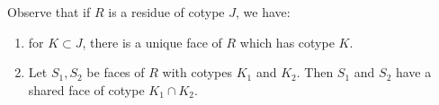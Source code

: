 \documentclass[11pt]{article}
\begin{document}
Observe that if $R$ is a residue of cotype $J$, we have:
\begin{enumerate}
    \item for $K\subset J$, there is a unique face of $R$ which has cotype $K$.
    \item Let $S_1,S_2$ be faces of $R$ with cotypes $K_1$ and $K_2$. Then $S_1$ and $S_2$ have a shared face of cotype $K_1\cap K_2$. 
\end{enumerate}










\end{document}
